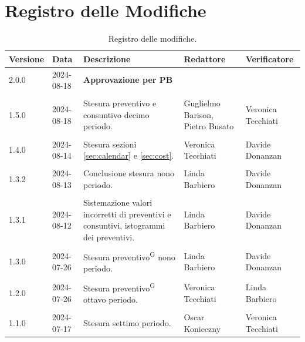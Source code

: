 \documentclass[8pt]{article}
\newcommand{\glossterm}[1]{#1\textsuperscript{G}} %
\begin{document}
\section*{Registro delle Modifiche}
\begin{table}[ht!]	
\hypersetup{hidelinks}
	\centering
	\begin{tabular}{p{1.2cm} p{2cm} p{5cm} p{3cm} p{3cm}}
		\toprule
		\textbf{Versione}& \textbf{Data} & \textbf{Descrizione} & \textbf{Redattore} & \textbf{Verificatore} \\
		\midrule
            2.0.0 & 2024-08-18 & \textbf{Approvazione per PB} & & \\\\
            1.5.0 & 2024-08-18 & Stesura preventivo e consuntivo decimo periodo. & Guglielmo Barison, Pietro Busato & Veronica Tecchiati \\\\
            1.4.0 & 2024-08-14 & Stesura sezioni \ref{sec:calendar} e \ref{sec:cost}. & Veronica Tecchiati & Davide Donanzan \\\\
            1.3.2 & 2024-08-13 & Conclusione stesura nono periodo. & Linda Barbiero & Davide Donanzan \\\\
            1.3.1 & 2024-08-12 & Sistemazione valori incorretti di preventivi e consuntivi, istogrammi dei preventivi. & Linda Barbiero & Davide Donanzan \\\\
            1.3.0 & 2024-07-26 & Stesura \glossterm{preventivo} nono periodo. & Linda Barbiero & Davide Donanzan
 		    \\\\
            1.2.0 & 2024-07-26 & Stesura \glossterm{preventivo} ottavo periodo. & Veronica Tecchiati & Linda Barbiero
 		    \\\\
			1.1.0 & 2024-07-17 & Stesura settimo periodo. & Oscar Konieczny & Veronica Tecchiati
 		    \\ %
		\bottomrule
	\end{tabular}
	\caption{Registro delle modifiche.}
	\label{table:Registro delle modifiche}
\end{table}
\clearpage
\end{document}
